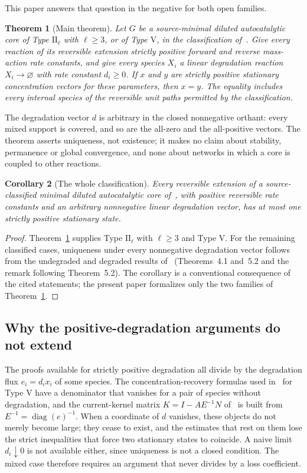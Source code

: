 \documentclass[11pt,a4paper]{article}
\theoremstyle{plain}
\newtheorem{theorem}{Theorem}[section]
\newtheorem{corollary}[theorem]{Corollary}
\theoremstyle{definition}
\theoremstyle{remark}
\numberwithin{equation}{section}
\newcommand{\diag}{\operatorname{diag}}
\newcommand{\II}{\mathrm{II}}
\newcommand{\V}{\mathrm{V}}
\begin{document}
This paper answers that question in the negative for both open families.

\begin{theorem}[Main theorem]\label{thm:main}
Let $G$ be a source-minimal diluted autocatalytic core of Type $\II_\ell$ with $\ell\ge3$, or of Type $\V$, in the classification of~\cite{NNU26}. Give every reaction of its reversible extension strictly positive forward and reverse mass-action rate constants, and give every species $X_i$ a linear degradation reaction $X_i\to\varnothing$ with rate constant $d_i\ge0$. If $x$ and $y$ are strictly positive stationary concentration vectors for these parameters, then $x=y$. The equality includes every internal species of the reversible unit paths permitted by the classification.
\end{theorem}

The degradation vector $d$ is arbitrary in the closed nonnegative orthant: every mixed support is covered, and so are the all-zero and the all-positive vectors. The theorem asserts uniqueness, not existence; it makes no claim about stability, permanence or global convergence, and none about networks in which a core is coupled to other reactions.

\begin{corollary}[The whole classification]\label{cor:classification}
Every reversible extension of a source-classified minimal diluted autocatalytic core of~\cite{NNU26}, with positive reversible rate constants and an arbitrary nonnegative linear degradation vector, has at most one strictly positive stationary state.
\end{corollary}

\begin{proof}
Theorem~\ref{thm:main} supplies Type $\II_\ell$ with $\ell\ge3$ and Type $\V$. For the remaining classified cases, uniqueness under every nonnegative degradation vector follows from the undegraded and degraded results of~\cite{NNU26} (Theorems~4.1 and~5.2 and the remark following Theorem~5.2). The corollary is a conventional consequence of the cited statements; the present paper formalizes only the two families of Theorem~\ref{thm:main}.
\end{proof}

\subsection*{Why the positive-degradation arguments do not extend}
The proofs available for strictly positive degradation all divide by the degradation flux $e_i=d_ix_i$ of some species. The concentration-recovery formulas used in~\cite{NNU26} for Type $\V$ have a denominator that vanishes for a pair of species without degradation, and the current-kernel matrix $K=I-AE^{-1}N$ of~\cite{TypeIIpos} is built from $E^{-1}=\diag(e)^{-1}$. When a coordinate of $d$ vanishes, these objects do not merely become large; they cease to exist, and the estimates that rest on them lose the strict inequalities that force two stationary states to coincide. A naive limit $d_i\downarrow0$ is not available either, since uniqueness is not a closed condition. The mixed case therefore requires an argument that never divides by a loss coefficient.
\end{document}
